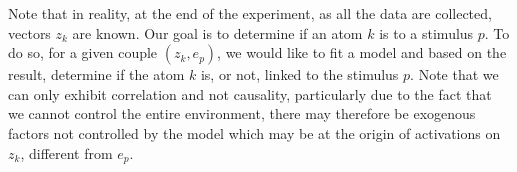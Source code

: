 Note that in reality, at the end of the experiment, as all the data are collected, vectors $z_k$ are known.
Our goal is to determine if an atom $k$ is  to a stimulus $p$.
To do so, for a given couple $(z_k, e_p)$, we would like to fit a model and based on the result, determine if the atom $k$ is, or not, linked to the stimulus $p$.
Note that we can only exhibit correlation and not causality, particularly due to the fact that we cannot control the entire environment, there may therefore be exogenous factors not controlled by the model which may be at the origin of activations on $z_k$, different from $e_p$. 
